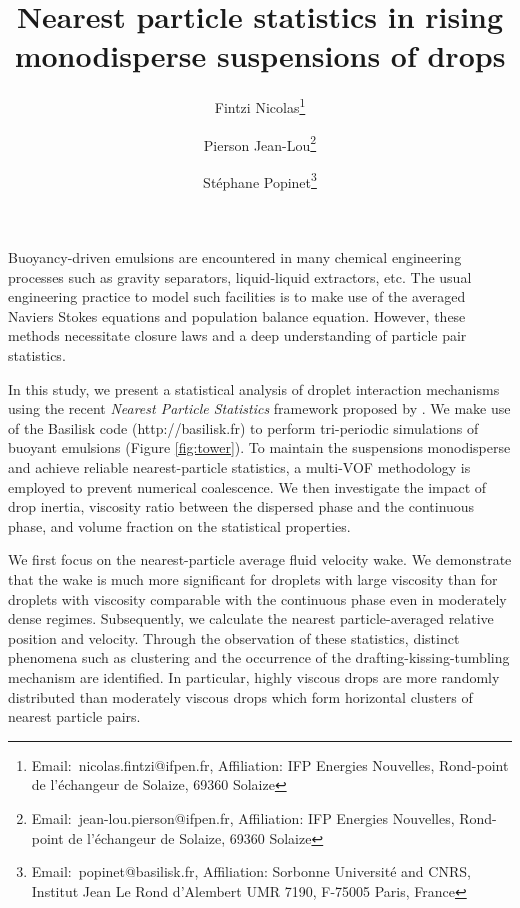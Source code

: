 \documentclass{icnmmf5}
\title{Nearest particle statistics in rising monodisperse suspensions of drops}
\author{Fintzi Nicolas\thanks{Email:~nicolas.fintzi@ifpen.fr, Affiliation: IFP Energies Nouvelles, Rond-point de l'échangeur de Solaize, 69360 Solaize
} \and %
Pierson Jean-Lou\thanks{Email:~jean-lou.pierson@ifpen.fr, Affiliation: IFP Energies Nouvelles, Rond-point de l'échangeur de Solaize, 69360 Solaize
}%
\and
St\'ephane Popinet\thanks{Email:~popinet@basilisk.fr, Affiliation: Sorbonne Université and CNRS, Institut Jean Le Rond d'Alembert UMR 7190, F-75005 Paris, France} }
\date{}
\begin{document}
\maketitle

Buoyancy-driven emulsions are encountered in many chemical engineering processes such as gravity separators, liquid-liquid extractors, etc. The usual engineering practice to model such facilities is to make use of the averaged Naviers Stokes equations and population balance equation. However, these methods necessitate closure laws and a deep understanding of particle pair statistics. %

In this study, we present a statistical analysis of droplet interaction mechanisms using the recent \textit{Nearest Particle Statistics} framework proposed by \cite{zhang2021ensemble}. We make use of the Basilisk code (http://basilisk.fr) to perform tri-periodic simulations of buoyant emulsions (Figure \ref{fig:tower}). To maintain the suspensions monodisperse and achieve reliable nearest-particle statistics, a multi-VOF methodology is employed to prevent numerical coalescence. We then investigate the impact of drop inertia, viscosity ratio between the dispersed phase and the continuous phase, and volume fraction on the statistical properties. 

We first focus on the nearest-particle average fluid velocity wake. We demonstrate that the wake is much more significant for droplets with large viscosity than for droplets with viscosity comparable with the continuous phase even in moderately dense regimes. Subsequently, we calculate the nearest particle-averaged relative position and velocity. Through the observation of these statistics, distinct phenomena such as clustering and the occurrence of the drafting-kissing-tumbling mechanism are identified. In particular, highly viscous drops are more randomly distributed than moderately viscous drops which form horizontal clusters of nearest particle pairs.


\end{document}
